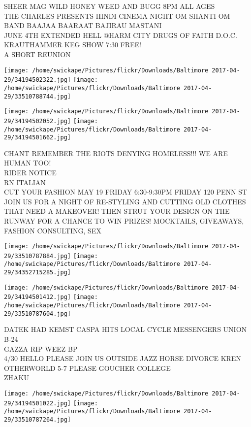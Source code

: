 \documentclass[10pt,letterpaper]{article}
\begin{document}
SHEER MAG WILD HONEY WEED AND BUGG 8PM ALL AGES\\
THE CHARLES PRESENTS HINDI CINEMA NIGHT OM SHANTI OM BAND BAAJAA BAARAAT BAJIRAU MASTANI\\
JUNE 4TH EXTENDED HELL @HARM CITY DRUGS OF FAITH D.O.C. KRAUTHAMMER KEG SHOW 7:30 FREE!\\
A SHORT REUNION\\
\pagebreak

\texttt{[image: /home/swickape/Pictures/flickr/Downloads/Baltimore 2017-04-29/34194502322.jpg]}
\texttt{[image: /home/swickape/Pictures/flickr/Downloads/Baltimore 2017-04-29/33510788744.jpg]}

\texttt{[image: /home/swickape/Pictures/flickr/Downloads/Baltimore 2017-04-29/34194502052.jpg]}
\texttt{[image: /home/swickape/Pictures/flickr/Downloads/Baltimore 2017-04-29/34194501662.jpg]}

CHANT REMEMBER THE RIOTS DENYING HOMELESS!!! WE ARE HUMAN TOO!\\
RIDER NOTICE\\
RN ITALIAN\\
CUT YOUR FASHION MAY 19 FRIDAY 6:30{-}9:30PM FRIDAY 120 PENN ST JOIN US FOR A NIGHT OF RE{-}STYLING AND CUTTING OLD CLOTHES THAT NEED A MAKEOVER!  THEN STRUT YOUR DESIGN ON THE RUNWAY FOR A CHANCE TO WIN PRIZES!  MOCKTAILS, GIVEAWAYS, FASHION CONSULTING, SEX\\
\pagebreak

\texttt{[image: /home/swickape/Pictures/flickr/Downloads/Baltimore 2017-04-29/33510787884.jpg]}
\texttt{[image: /home/swickape/Pictures/flickr/Downloads/Baltimore 2017-04-29/34352715285.jpg]}

\texttt{[image: /home/swickape/Pictures/flickr/Downloads/Baltimore 2017-04-29/34194501412.jpg]}
\texttt{[image: /home/swickape/Pictures/flickr/Downloads/Baltimore 2017-04-29/33510787604.jpg]}

DATEK HAD KEMST CASPA HITS LOCAL CYCLE MESSENGERS UNION B{-}24\\
GAZZA RIP WEEZ BP\\
4/30 HELLO PLEASE JOIN US OUTSIDE JAZZ HORSE DIVORCE KREN OTHERWORLD 5{-}7 PLEASE GOUCHER COLLEGE\\
ZHAKU\\
\pagebreak

\texttt{[image: /home/swickape/Pictures/flickr/Downloads/Baltimore 2017-04-29/34194501022.jpg]}
\texttt{[image: /home/swickape/Pictures/flickr/Downloads/Baltimore 2017-04-29/33510787264.jpg]}
\end{document}
